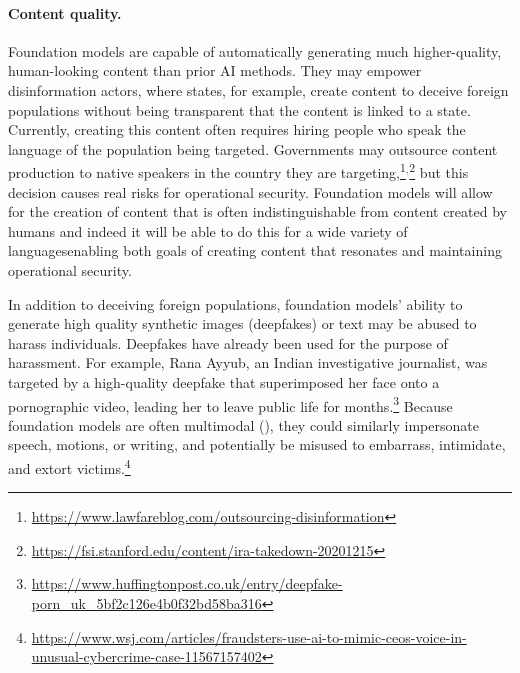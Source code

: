 \paragraph{Content quality.}
Foundation models are capable of automatically generating much higher-quality, human-looking content than prior AI methods. 
They may empower disinformation actors, where states, for example, create content to deceive foreign populations without being transparent that the content is linked to a state. Currently, creating this content often requires hiring people who speak the language of the population being targeted. Governments may outsource content production to native speakers in the country they are targeting,\footnote{\url{https://www.lawfareblog.com/outsourcing-disinformation}}$^{,}$\footnote{ \url{https://fsi.stanford.edu/content/ira-takedown-20201215}} but this decision causes real risks for operational security. Foundation models will allow for the creation of content that is often indistinguishable from content created by humans \citep{kreps_mccain_brundage_2020, clark2021all}\dash{}and indeed it will be able to do this for a wide variety of languages\dash{}enabling both goals of creating content that resonates and maintaining operational security. 

In addition to deceiving foreign populations, foundation models’ ability to generate high quality synthetic images (deepfakes) or text may be abused to harass individuals. Deepfakes have already been used for the purpose of harassment. 
For example, Rana Ayyub, an Indian investigative journalist, was targeted by a high-quality deepfake that superimposed her face onto a pornographic video, leading her to leave public life for months.\footnote{\url{ https://www.huffingtonpost.co.uk/entry/deepfake-porn_uk_5bf2c126e4b0f32bd58ba316}}
Because foundation models are often multimodal (), they could similarly impersonate speech, motions, or writing, and potentially be misused to embarrass, intimidate, and extort victims.\footnote{\href{https://www.wsj.com/articles/fraudsters-use-ai-to-mimic-ceos-voice-in-unusual-cybercrime-case-11567157402}{{ https://www.wsj.com/articles/fraudsters-use-ai-to-mimic-ceos-voice-in-unusual-cybercrime-case-11567157402}}}

